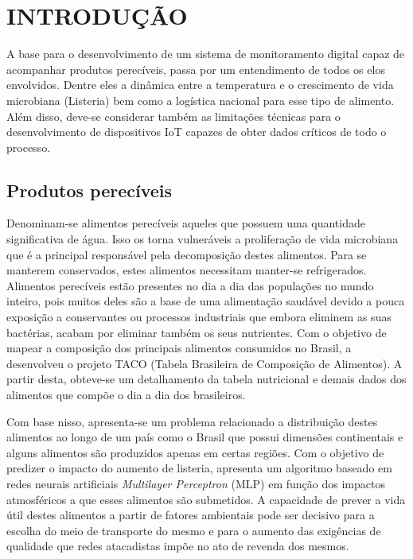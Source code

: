 \chapter{INTRODUÇÃO}\label{cap:introducao}
A base para o desenvolvimento de um sistema de monitoramento digital capaz de acompanhar produtos perecíveis, passa por um entendimento de todos os elos envolvidos. Dentre eles a dinâmica entre a temperatura e o crescimento de vida microbiana (Listeria) bem como a logística nacional para esse tipo de alimento. Além disso, deve-se considerar também as limitações técnicas para o desenvolvimento de dispositivos IoT capazes de obter dados críticos de todo o processo.
\section{Produtos perecíveis}
Denominam-se alimentos perecíveis aqueles que possuem uma quantidade significativa de água. Isso os torna vulneráveis a proliferação de vida microbiana que é a principal responsável pela decomposição destes alimentos. Para se manterem conservados, estes alimentos necessitam manter-se refrigerados.
Alimentos perecíveis estão presentes no dia a dia das populações no mundo inteiro, pois muitos deles são a base de uma alimentação saudável devido a pouca exposição a conservantes ou processos industriais que embora eliminem as suas bactérias, acabam por eliminar também os seus nutrientes.
Com o objetivo de mapear a composição dos principais alimentos consumidos no Brasil, a  desenvolveu o projeto TACO (Tabela Brasileira de Composição de Alimentos). A partir desta, obteve-se um detalhamento da tabela nutricional e demais dados dos alimentos que compõe o dia a dia dos brasileiros.

Com base nisso, apresenta-se um problema relacionado a distribuição destes alimentos ao longo de um país como o Brasil que possui dimensões continentais e alguns alimentos são produzidos apenas em certas regiões.
Com o objetivo de predizer o impacto do aumento de listeria,  apresenta um algoritmo baseado em redes neurais artificiais \textit{Multilayer Perceptron} (MLP) em função dos impactos atmosféricos a que esses alimentos são submetidos. A capacidade de prever a vida útil destes alimentos a partir de fatores ambientais pode ser decisivo para a escolha do meio de transporte do mesmo e para o aumento das exigências de qualidade que redes atacadistas impõe no ato de revenda dos mesmos.

